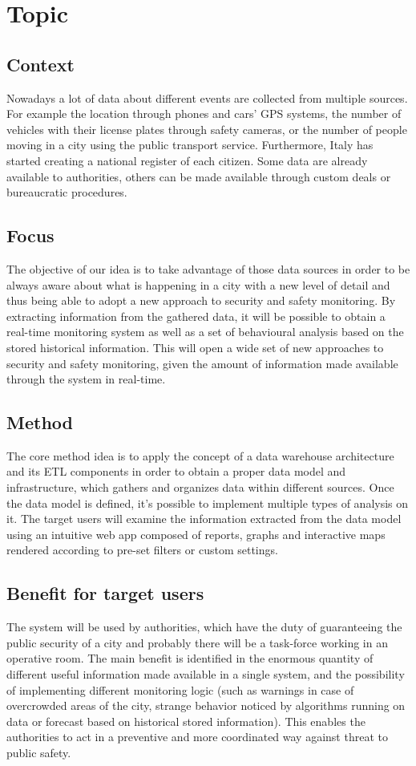 \documentclass[../main.tex]{subfiles}
\begin{document}
    \chapter{Topic}
    \section{Context}
    Nowadays a lot of data about different events are collected from multiple sources.
    For example the location through phones and cars’ GPS systems,
    the number of vehicles with their license plates through safety cameras,
    or the number of people moving in a city using the public transport service.
    Furthermore, Italy has started creating a national register of each citizen.
    Some data are already available to authorities,
    others can be made available through custom deals or bureaucratic procedures.


    \section{Focus}
    The objective of our idea is to take advantage of those data sources in order to be always aware about what is happening in a city with a new level of detail and thus being able to adopt a new approach to security and safety monitoring. By extracting information from the gathered data, it will be possible to obtain a real-time monitoring system as well as a set of behavioural analysis based on the stored historical information. This will open a wide set of new approaches to security and safety monitoring, given the amount of information made available through the system in real-time.


    \section{Method}
    The core method idea is to apply the concept of a data warehouse architecture and its ETL components in order to obtain a proper data model and infrastructure, which gathers and organizes data within different sources.
    Once the data model is defined, it’s possible to implement multiple types of analysis on it.
    The target users will examine the information extracted from the data model using an intuitive web app composed of reports, graphs and interactive maps rendered according to pre-set filters or custom settings.


    \section{Benefit for target users}
    The system will be used by authorities, which have the duty of guaranteeing the public security of a city and probably there will be a task-force working in an operative room.
    The main benefit is identified in the enormous quantity of different useful information made available in a single system, and the possibility of implementing different monitoring logic (such as warnings in case of overcrowded areas of the city, strange behavior noticed by algorithms running on data or forecast based on historical stored information). This enables
    the authorities to act in a preventive and more coordinated way against threat to public safety.
\end{document}
